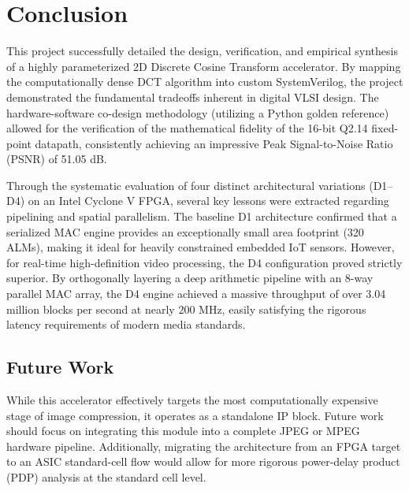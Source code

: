 \section{Conclusion}

This project successfully detailed the design, verification, and empirical synthesis of a highly parameterized 2D Discrete Cosine Transform accelerator. By mapping the computationally dense DCT algorithm into custom SystemVerilog, the project demonstrated the fundamental tradeoffs inherent in digital VLSI design. The hardware-software co-design methodology (utilizing a Python golden reference) allowed for the verification of the mathematical fidelity of the 16-bit Q2.14 fixed-point datapath, consistently achieving an impressive Peak Signal-to-Noise Ratio (PSNR) of 51.05 dB.

Through the systematic evaluation of four distinct architectural variations (D1--D4) on an Intel Cyclone V FPGA, several key lessons were extracted regarding pipelining and spatial parallelism. The baseline D1 architecture confirmed that a serialized MAC engine provides an exceptionally small area footprint (320 ALMs), making it ideal for heavily constrained embedded IoT sensors. However, for real-time high-definition video processing, the D4 configuration proved strictly superior. By orthogonally layering a deep arithmetic pipeline with an 8-way parallel MAC array, the D4 engine achieved a massive throughput of over 3.04 million blocks per second at nearly 200 MHz, easily satisfying the rigorous latency requirements of modern media standards.

\subsection{Future Work}
While this accelerator effectively targets the most computationally expensive stage of image compression, it operates as a standalone IP block. Future work should focus on integrating this module into a complete JPEG or MPEG hardware pipeline. Additionally, migrating the architecture from an FPGA target to an ASIC standard-cell flow would allow for more rigorous power-delay product (PDP) analysis at the standard cell level.
